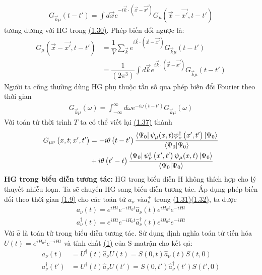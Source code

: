 \documentclass{report}
\begin{document}
\begin{align}
	G_{\vec{k}\mu}(t-t') = \displaystyle\int{}{} d\vec{x}e^{-i\vec{k}\cdot\left( \vec{x} - \vec{x'} \right)} G_{\mu} \left( \vec{x} - \vec{x'},t-t' \right)
\end{align}
tương đương với HG trong \hyperref[eq1.30]{(1.30)}. Phép biến đổi ngược là:
\begin{align}
	G_{\mu}(\vec{x}-\vec{x'},t-t')
	 & = \dfrac{1}{V}\sum_{\vec{k}}^{}e^{i\vec{k}\cdot\left(\vec{x} - \vec{x'}\right)}G_{\vec{k}\mu}(t-t')\nonumber                       \\
	 & =\dfrac{1}{\left(2\pi^3\right)}\int_{}^{}d\vec{k}e^{i\vec{k}\cdot\left(\vec{x} - \vec{x'}\right)}G_{\vec{k}\mu}\left( t-t' \right)
\end{align}
Người ta cũng thường dùng HG phụ thuộc tần số qua phép biến đổi Fourier theo thời gian
\begin{align}
	G_{\vec{k}\mu}(\omega) = \int_{-\infty}^{\infty}d\omega e^{-i\omega\left( t-t' \right)}G_{\vec{k}\mu}(\omega)
\end{align}
Với toán tử thời trình $T$ ta có thể viết lại \hyperref[eq1.37]{(1.37)} thành
\begin{align}\label{eq1.44}
	G_{\mu\nu}\left( x,t;x',t' \right) & = -i \theta\left( t-t' \right)\dfrac{ \bra{\Psi_0}\psi_{\mu}(x,t)\psi^{\dagger}_{\nu}\left( x',t' \right) \ket{\Psi_0}} {\bra{\Psi_0}\ket{\Psi_0}}\nonumber \\
	                                   & + i\theta\left(t'-t\right)\dfrac{ \bra{\Psi_0}\psi^{\dagger}_{\nu}\left( x',t' \right)\psi_{\mu}(x,t) \ket{\Psi_0}} {\bra{\Psi_0}\ket{\Psi_0}}
\end{align}
\newpage
\textbf{HG trong biểu diễn tương tác:} HG trong biểu diễn H không thích hợp cho lý thuyết nhiễu loạn. Ta sẽ chuyển HG sang biểu diễn tương tác. Áp dụng phép biến đổi theo thời gian \hyperref[eq1.9]{(1.9)} cho các toán tử $a_{\nu}$ và$ a^{+}_{\nu}$ trong \hyperref[eq1.31]{(1.31)}\hyperref[eq1.32]{(1.32)}, ta được
\begin{align}
	a_{\nu}(t) = e^{iHt} e^{-iH_0t} \hat{a}_{\nu}(t) e^{iH_0t} e^{-iHt} \\
	a^{\dagger}_{\nu}(t) = e^{iHt} e^{-iH_0t} \hat{a}^{\dagger}_{\nu}(t) e^{iH_0t} e^{-iHt}
\end{align}
Với $\hat{a}$ là toán tử trong biểu diễn tương tác. Sử dụng định nghĩa toán tử tiến hóa $U(t) = e^{iH_0t}e^{-iHt}$ và tính chất \hyperref[tc1]{(1)} của S-matrận cho kết qả:
\begin{align}
	\label{eq1.47}
	a_{\nu}(t)            & = U^{\dagger}(t) \hat{a}_{\nu}U(t) = S(0,t)\hat{a}_{\nu}(t)S(t,0)               \\
	\label{eq1.48}
	a^{\dagger}_{\nu}(t') & = U^{\dagger}(t) \hat{a}_{\nu}U(t') = S(0,t')\hat{a}^{\dagger}_{\nu}(t')S(t',0)
\end{align}
\end{document}
